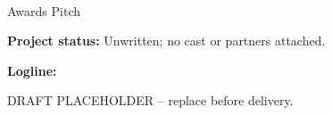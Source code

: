 \documentclass[11pt,letterpaper]{article}
\begin{document}
\begin{center}
{\Large\bfseries\sffamily \filmtitleupper}\\[6pt]
Awards Pitch
\end{center}
\textbf{Project status:} Unwritten; no cast or partners attached.

\textbf{Logline:} \filmlogline

DRAFT PLACEHOLDER -- replace before delivery.
\end{document}
